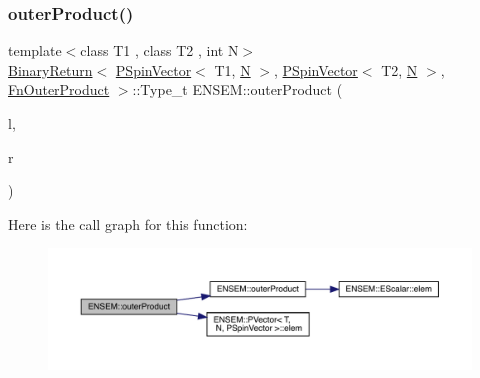 \subsubsection{\texorpdfstring{outerProduct()}{outerProduct()}}
{\footnotesize\ttfamily template$<$class T1 , class T2 , int N$>$ \\
\mbox{\hyperlink{structENSEM_1_1BinaryReturn}{Binary\+Return}}$<$ \mbox{\hyperlink{classENSEM_1_1PSpinVector}{P\+Spin\+Vector}}$<$ T1, \mbox{\hyperlink{operator__name__util_8cc_a7722c8ecbb62d99aee7ce68b1752f337}{N}} $>$, \mbox{\hyperlink{classENSEM_1_1PSpinVector}{P\+Spin\+Vector}}$<$ T2, \mbox{\hyperlink{operator__name__util_8cc_a7722c8ecbb62d99aee7ce68b1752f337}{N}} $>$, \mbox{\hyperlink{structENSEM_1_1FnOuterProduct}{Fn\+Outer\+Product}} $>$\+::Type\+\_\+t E\+N\+S\+E\+M\+::outer\+Product (\begin{DoxyParamCaption}\item[{const \mbox{\hyperlink{classENSEM_1_1PSpinVector}{P\+Spin\+Vector}}$<$ T1, \mbox{\hyperlink{operator__name__util_8cc_a7722c8ecbb62d99aee7ce68b1752f337}{N}} $>$ \&}]{l,  }\item[{const \mbox{\hyperlink{classENSEM_1_1PSpinVector}{P\+Spin\+Vector}}$<$ T2, \mbox{\hyperlink{operator__name__util_8cc_a7722c8ecbb62d99aee7ce68b1752f337}{N}} $>$ \&}]{r }\end{DoxyParamCaption})\hspace{0.3cm}{\ttfamily [inline]}}

Here is the call graph for this function\+:\nopagebreak
\begin{figure}[H]
\begin{center}
\leavevmode
\includegraphics[width=350pt]{d6/df5/group__primspinmatrix_ga6ff39d20fc8369664c9b3849e00d654d_cgraph}
\end{center}
\end{figure}
\mbox{\label{group__primspinmatrix_ga2af6db806ff17a39ca84960a216d33c7}} 
